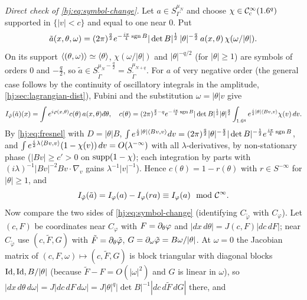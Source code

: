 \emph{Direct check of \eqref{hj:eq:symbol-change}.} Let $a\in S^{\mu_N}_\Gamma$ and choose
$\chi\in\mathcal{C}^\infty_{\mathrm{c}}(1.6^q)$ supported in $\{|v|<c\}$ and equal to one near $0$. Put
\begin{equation*}
\tilde a(x,\theta,\omega)=(2\pi)^{\frac q2}e^{-\frac{i\pi}4\operatorname{sgn} B}|\det B|^{\frac12}\,
|\theta|^{-\frac q2}\,a(x,\theta)\,\chi(\omega/|\theta|).
\end{equation*}
On its support $\langle (\theta,\omega)\rangle\simeq\langle \theta\rangle$, $\chi(\omega/|\theta|)$ and
$|\theta|^{-q/2}$ (for $|\theta|\ge1$) are symbols of orders $0$ and $-\frac q2$, so
$\tilde a\in S^{\mu_N-\frac q2}_{\tilde\Gamma}=S^{\mu_{N+q}}_{\tilde\Gamma}$. For $a$ of very
negative order (the general case follows by the continuity of oscillatory integrals in the
amplitude, \cref{hj:sec:lagrangian-dist}), Fubini and the substitution $\omega=|\theta|v$ give
\begin{equation*}
I_{\tilde\varphi}(\tilde a)(x)=\int e^{i\varphi(x,\theta)}c(\theta)\,a(x,\theta)\,\dbar\theta,
\quad c(\theta)=(2\pi)^{\frac q2-q}e^{-\frac{i\pi}4\sgn B}|\det B|^{\frac12}|\theta|^{\frac q2}
\int_{\R^q}e^{\frac i2|\theta|\ang{Bv,v}}\chi(v)\,dv .
\end{equation*}
By \eqref{hj:eq:fresnel} with $D=|\theta|B$, $\int e^{\frac i2|\theta|\langle Bv,v\rangle}dv=(2\pi)^{
\frac q2}|\theta|^{-\frac q2}|\det B|^{-\frac12}e^{\frac{i\pi}4\operatorname{sgn} B}$, and
$\int e^{\frac i2\lambda\langle Bv,v\rangle}(1-\chi(v))\,dv=O(\lambda^{-\infty})$ with all
$\lambda$-derivatives, by non-stationary phase ($|Bv|\ge c'>0$ on $\operatorname{supp}(1-\chi)$; each
integration by parts with $(i\lambda)^{-1}|Bv|^{-2}Bv\cdot\nabla_v$ gains $\lambda^{-1}|v|^{-1}$).
Hence $c(\theta)=1-r(\theta)$ with $r\in S^{-\infty}$ for $|\theta|\ge1$, and
\begin{equation*}
I_{\tilde\varphi}(\tilde a)=I_\varphi(a)-I_\varphi(ra)\equiv I_\varphi(a)\mod{\mathcal{C}^\infty} .
\end{equation*}
Now compare the two sides of \eqref{hj:eq:symbol-change} (identifying $C_{\tilde\varphi}$
with $C_\varphi$). Let $(c,F)$ be coordinates near $C_\varphi$ with $F=\partial_\theta\varphi$ and
$|dx\,d\theta|=J(c,F)|dc\,dF|$; near $C_{\tilde\varphi}$ use $(c,\tilde F,G)$ with
$\tilde F=\partial_\theta\tilde\varphi$, $G=\partial_\omega\tilde\varphi=B\omega/|\theta|$. At $\omega=0$
the Jacobian matrix of $(c,F,\omega)\mapsto(c,\tilde F,G)$ is block triangular with diagonal
blocks $\operatorname{Id},\operatorname{Id},B/|\theta|$ (because $\tilde F-F=O(|\omega|^2)$ and $G$ is linear in $\omega$),
so $|dx\,d\theta\,d\omega|=J|dc\,dF\,d\omega|=J|\theta|^q|\det B|^{-1}|dc\,d\tilde F\,dG|$
there, and

